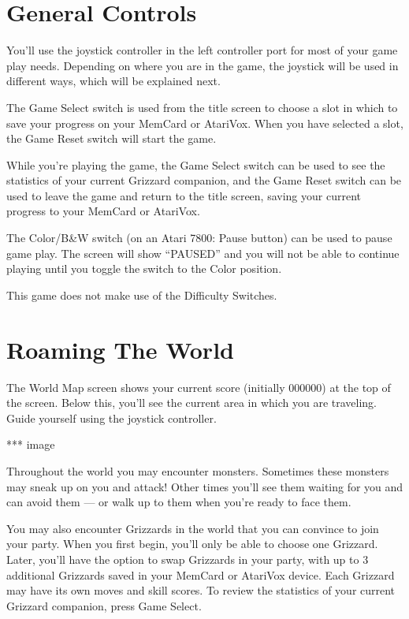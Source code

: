 \documentclass[10pt,twoside,openright]{memoir}
\begin{document}
\section{General Controls}

You'll use the joystick controller in the left controller port for most of
your game play needs. Depending on where you are in the game, the joystick
will be used in different ways, which will be explained next.

The Game Select switch is used from the title screen to choose a slot in
which to save your progress on your MemCard or AtariVox. When you have
selected a slot, the Game Reset switch will start the game.

While you're playing the game, the Game Select switch can be used to see the
statistics of your current Grizzard companion, and the Game Reset switch can
be used to leave the game and return to the title screen, saving your
current progress to your MemCard or AtariVox.

The Color/B&W switch (on an Atari 7800: Pause button) can be used to pause
game play. The screen will show ``PAUSED'' and you will not be able to
continue playing until you toggle the switch to the Color position.

This game does not make use of the Difficulty Switches.


\section{Roaming The World}

The World Map screen shows your current score (initially 000000) at the top
of the screen.  Below this, you'll see the current area in which you are
traveling.  Guide yourself using the joystick controller.

*** image

Throughout the world you may encounter monsters. Sometimes these monsters
may sneak up on you and attack! Other times you'll see them waiting for you
and can avoid them --- or walk up to them when you're ready to face them.

You may also encounter Grizzards in the world that you can convince to join
your party. When you first begin, you'll only be able to choose one
Grizzard. Later, you'll have the option to swap Grizzards in your party,
with up to 3 additional Grizzards saved in your MemCard or AtariVox device.
Each Grizzard may have its own moves and skill scores. To review the
statistics of your current Grizzard companion, press Game Select.
\end{document}
